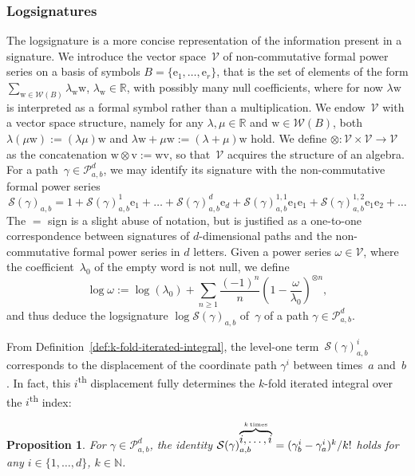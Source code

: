 \documentclass{amsart}[11pt]
\numberwithin{equation}{section}
\newtheorem{proposition}[theorem]{Proposition}
\theoremstyle{definition}
\newcommand{\Pp}{\mathcal{P}}
\newcommand{\Vv}{\mathcal{V}}
\newcommand{\vv}{\mathrm{v}}
\newcommand{\ww}{\mathrm{w}}
\newcommand{\Ww}{\mathcal{W}}
\newcommand{\Ss}{\mathcal{S}}
\newcommand{\NN}{\mathbb{N}}
\newcommand{\RR}{\mathbb{R}}
\newcommand{\E}{\mathrm{e}}
\newcommand{\Pab}{\Pp_{a,b}^{d}}
\newcommand{\tens} {\mathbin{\mathop{\otimes}}}
\begin{document}
\subsubsection{Logsignatures}
\label{sec:log-signature}
The logsignature is a more concise representation of the information present in a signature.
We introduce the vector space~$\Vv$ of non-commutative formal power series on a basis of symbols $B = \{\E_1, \ldots, \E_r\}$,
that is the set of elements of the form $\sum_{\ww\in\Ww(B)} \lambda_{\ww}\ww$, $\lambda_{\ww} \in \mathbb{R}$, with possibly many null coefficients, where for now $\lambda \ww$ is interpreted as a formal symbol rather than a multiplication.
We endow~$\Vv$ with a vector space structure, namely for any $\lambda, \mu \in \RR$
and $\ww\in \Ww(B)$,
both $\lambda (\mu \ww) := (\lambda \mu) \ww$ and $\lambda \ww + \mu \ww := (\lambda + \mu) \ww$ hold.
We define $\tens: \Vv \times \Vv \to \Vv$ as
the concatenation $\ww \tens \vv := \ww\vv$, so that~$\Vv$ acquires the structure of an algebra.
For a path~$\gamma\in\Pab$, we may identify its signature with the non-commutative formal power series
\begin{equation}\label{eq:FormalPower}
\Ss(\gamma)_{a, b} = 1 + \Ss(\gamma)_{a, b}^1 \E_1 + \ldots + \Ss(\gamma)_{a,b}^d \E_d + \Ss(\gamma)_{a,b}^{1, 1} \E_1 \E_1 + \Ss(\gamma)_{a,b}^{1,2} \E_1 \E_2 + \ldots
\end{equation}
The $=$ sign is a slight abuse of notation, but is justified as a one-to-one correspondence between signatures of $d$-dimensional paths and the non-commutative formal power series in $d$ letters.
Given a power series $\omega \in \Vv$, where the coefficient~$\lambda_0$ of the empty word
is not null, we define
\begin{equation}\label{eq:logsignature-defn}
\log \omega := \log(\lambda_0) + \sum_{n \geq 1} \frac{(-1)^n}{n} \left( 1 - \frac{\omega}{\lambda_0}\right)^{\tens n},
\end{equation}
and thus deduce the logsignature $\log \Ss(\gamma)_{a,b}$ of~$\gamma$ of a path $\gamma\in\Pab$.

From Definition~\ref{def:k-fold-iterated-integral}, the level-one term~$\Ss(\gamma)^i_{a,b}$
corresponds to the displacement of the coordinate path $\gamma^i$ between times~$a$ and~$b$.
In fact, this $i$\textsuperscript{th} displacement fully determines the $k$-fold iterated integral
over the $i$\textsuperscript{th} index:
\begin{proposition}\label{prop:signature-of-word-of-one-letter}
For $\gamma\in\Pab$, the identity
$\Ss(\gamma)^{\overbrace{i, \ldots, i}^{k \,\rm{times}}}_{a, b} = (\gamma^i_b - \gamma^i_a)^k / k!$
holds for any $i \in \{1, \ldots, d\}$, $k \in \NN$.
\end{proposition}
\end{document}
